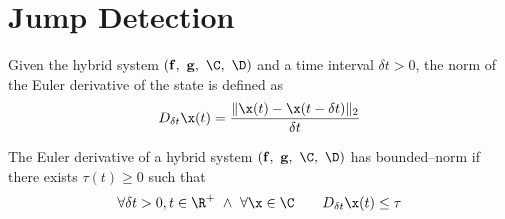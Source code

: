 \clearpage
\section{Jump Detection}\label{JumpD}
%
\begin{defn}
	Given the hybrid system $(\mathbf{\mathbf{f}},~\mathbf{g},~\C,~\D)$ and a time interval $\delta t>0$, the norm of the Euler derivative of the state is defined as
	\[D_{\delta t}\x(t)= \frac{\|\x(t)-\x(t-\delta t)\|_2}{\delta t}\]
\end{defn}
%
\begin{defn}
	The Euler derivative of a hybrid system $(\mathbf{\mathbf{f}},~\mathbf{g},~\C,~\D)$ has bounded--norm if there exists $\tau(t)\geq 0$ such that
	\[\forall\delta t>0,t\in\R^+~\land~\forall \x\in\C\quad\quad D_{\delta t}\x(t)\leq\tau\]
\end{defn}
%

